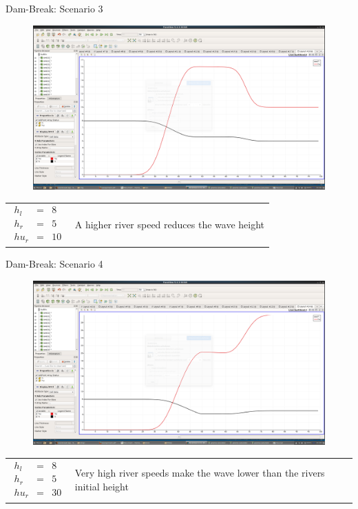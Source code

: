 \documentclass[shortpres]{beamer}
\newcommand{\imgvoffset}{-20pt}
\newcommand{\imgfullscale}{0.75}
\begin{document}
\begin{frame}{Dam-Break: Scenario 3}
	\begin{figure}[t]
		\vspace{\imgvoffset}
		\includegraphics[width=\imgfullscale\linewidth]{img/Dam_river.png}
		\caption*{}
	\end{figure}
	
	\begin{tabular}{m{3cm} m{\linewidth-5cm}}
		$
		\begin{matrix}
		h_l & = & 8\\
		h_r & = & 5\\
		hu_r & = & 10
		\end{matrix}
		$
		&
		
		A higher river speed reduces the wave height
	\end{tabular}
\end{frame}

\begin{frame}{Dam-Break: Scenario 4}
	\begin{figure}[t]
		\vspace{\imgvoffset}
		\includegraphics[width=\imgfullscale\linewidth]{img/Dam_highspeedriver.png}
		\caption*{}
	\end{figure}
	
	\begin{tabular}{m{3cm} m{\linewidth-5cm}}
		$
		\begin{matrix}
		h_l & = & 8\\
		h_r & = & 5\\
		hu_r & = & 30
		\end{matrix}
		$
		&
		
		Very high river speeds make the wave lower than the rivers initial height
	\end{tabular}
\end{frame}
\end{document}
